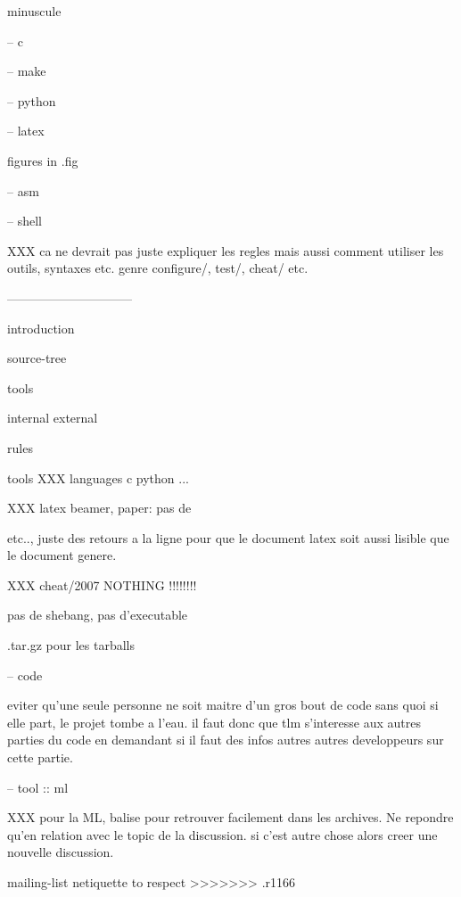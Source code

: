 minuscule

-- c

-- make

-- python

-- latex

figures in .fig

-- asm

-- shell

XXX
ca ne devrait pas juste expliquer les regles mais aussi comment utiliser
les outils, syntaxes etc. genre configure/, test/, cheat/ etc.

------------------------------

introduction

source-tree

tools

  internal
  external

rules

  tools
    XXX
  languages
    c
    python
    ...

XXX latex
beamer, %
paper: pas de \par etc.., juste des retours a la ligne pour que le document
latex soit aussi lisible que le document genere.

XXX cheat/2007 NOTHING !!!!!!!!

pas de shebang, pas d'executable

.tar.gz pour les tarballs

-- code

eviter qu'une seule personne ne soit maitre d'un gros bout de code sans
quoi si elle part, le projet tombe a l'eau. il faut donc que tlm s'interesse
aux autres parties du code en demandant si il faut des infos autres autres
developpeurs sur cette partie.

-- tool :: ml

XXX pour la ML, balise pour retrouver facilement dans les archives.
Ne repondre qu'en relation avec le topic de la discussion. si c'est autre
chose alors creer une nouvelle discussion.

mailing-list netiquette to respect
>>>>>>> .r1166
